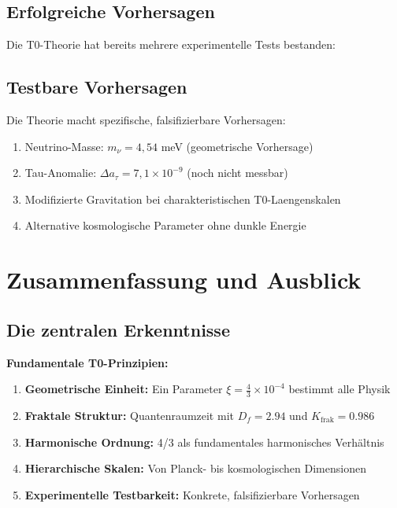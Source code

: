 \documentclass[12pt,a4paper]{article}
\newcommand{\xipar}{\xi}
\begin{document}
\subsection{Erfolgreiche Vorhersagen}

Die T0-Theorie hat bereits mehrere experimentelle Tests bestanden:



\subsection{Testbare Vorhersagen}

\begin{keyresult}
	Die Theorie macht spezifische, falsifizierbare Vorhersagen:
	\begin{enumerate}
		\item Neutrino-Masse: $m_\nu = 4{,}54$ meV (geometrische Vorhersage)
		\item Tau-Anomalie: $\Delta a_\tau = 7{,}1 \times 10^{-9}$ (noch nicht messbar)
		\item Modifizierte Gravitation bei charakteristischen T0-Laengenskalen
		\item Alternative kosmologische Parameter ohne dunkle Energie
	\end{enumerate}
\end{keyresult}
	\section{Zusammenfassung und Ausblick}
	
	\subsection{Die zentralen Erkenntnisse}
	
	\begin{foundation}
		\textbf{Fundamentale T0-Prinzipien:}
		
		\begin{enumerate}
			\item \textbf{Geometrische Einheit:} Ein Parameter $\xipar = \frac{4}{3} \times 10^{-4}$ bestimmt alle Physik
			\item \textbf{Fraktale Struktur:} Quantenraumzeit mit $D_f = 2.94$ und $K_{\text{frak}} = 0.986$
			\item \textbf{Harmonische Ordnung:} 4/3 als fundamentales harmonisches Verhältnis
			\item \textbf{Hierarchische Skalen:} Von Planck- bis kosmologischen Dimensionen
			\item \textbf{Experimentelle Testbarkeit:} Konkrete, falsifizierbare Vorhersagen
		\end{enumerate}
	\end{foundation}
	
\end{document}
